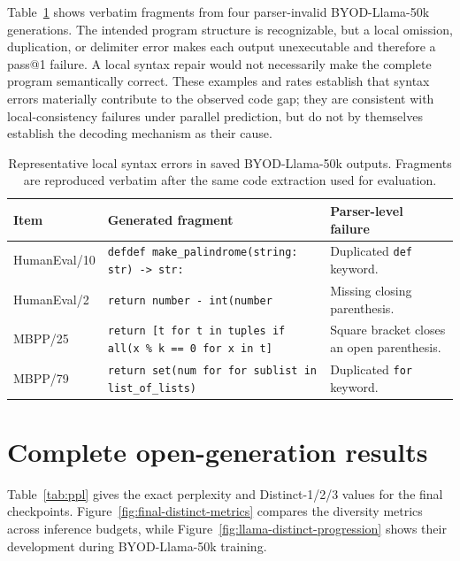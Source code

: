\documentclass{article}
\begin{document}
Table~\ref{tab:syntax-examples} shows verbatim fragments from four parser-invalid BYOD-Llama-50k generations. The intended program structure is recognizable, but a local omission, duplication, or delimiter error makes each output unexecutable and therefore a pass@1 failure. A local syntax repair would not necessarily make the complete program semantically correct. These examples and rates establish that syntax errors materially contribute to the observed code gap; they are consistent with local-consistency failures under parallel prediction, but do not by themselves establish the decoding mechanism as their cause.

\begin{table}[t]
\caption{Representative local syntax errors in saved BYOD-Llama-50k outputs. Fragments are reproduced verbatim after the same code extraction used for evaluation.}
\label{tab:syntax-examples}
\centering
\small
\begin{tabular}{p{}p{}p{}}
\toprule
Item & Generated fragment & Parser-level failure \\
\midrule
HumanEval/10 & \texttt{defdef make\_palindrome(string: str) -> str:} & Duplicated \texttt{def} keyword. \\
HumanEval/2 & \texttt{return number - int(number} & Missing closing parenthesis. \\
MBPP/25 & \texttt{return [t for t in tuples if all(x \% k == 0 for x in t]} & Square bracket closes an open parenthesis. \\
MBPP/79 & \texttt{return set(num for for sublist in list\_of\_lists)} & Duplicated \texttt{for} keyword. \\
\bottomrule
\end{tabular}
\end{table}

\clearpage
\section{Complete open-generation results}
\label{app:open-generation-results}

Table~\ref{tab:ppl} gives the exact perplexity and Distinct-1/2/3 values for the final checkpoints. Figure~\ref{fig:final-distinct-metrics} compares the diversity metrics across inference budgets, while Figure~\ref{fig:llama-distinct-progression} shows their development during BYOD-Llama-50k training.
\end{document}
